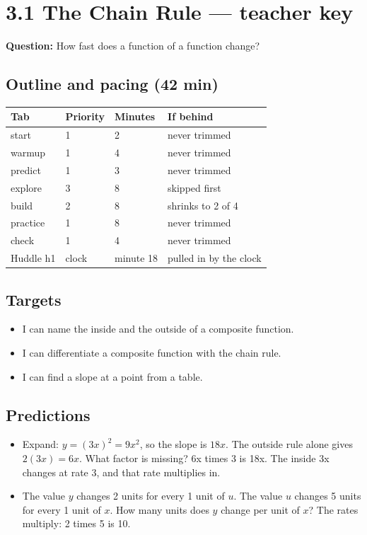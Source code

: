 \documentclass[11pt]{article}
\begin{document}
\section*{3.1 The Chain Rule --- teacher key}
\textbf{Question:} How fast does a function of a function change?\par
\subsection*{Outline and pacing (42 min)}\begin{tabular}{@{}llll@{}}\toprule Tab & Priority & Minutes & If behind\\\midrule
start & 1 & 2 & never trimmed\\
warmup & 1 & 4 & never trimmed\\
predict & 1 & 3 & never trimmed\\
explore & 3 & 8 & skipped first\\
build & 2 & 8 & shrinks to 2 of 4\\
practice & 1 & 8 & never trimmed\\
check & 1 & 4 & never trimmed\\
Huddle h1 & clock & minute 18 & pulled in by the clock\\
\bottomrule\end{tabular}
\subsection*{Targets}\begin{itemize}\item I can name the inside and the outside of a composite function.
\item I can differentiate a composite function with the chain rule.
\item I can find a slope at a point from a table.\end{itemize}
\subsection*{Predictions}\begin{itemize}
\item Expand: $y=(3x)^2=9x^2$, so the slope is $18x$. The outside rule alone gives $2(3x)=6x$. What factor is missing?  6x times 3 is 18x. The inside 3x changes at rate 3, and that rate multiplies in.
\item The value $y$ changes 2 units for every 1 unit of $u$. The value $u$ changes 5 units for every 1 unit of $x$. How many units does $y$ change per unit of $x$?  The rates multiply: 2 times 5 is 10.
\end{itemize}
\end{document}
